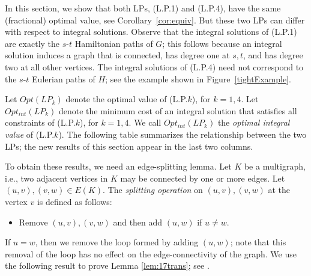 \documentclass[11pt]{article}
\begin{document}
In this section, we show that both LPs, (L.P.1) and (L.P.4), have
the same (fractional) optimal value, see Corollary~\ref{cor:equiv}.
But these two LPs can differ with respect to integral solutions.
Observe that the integral solutions of (L.P.1) are
exactly the $s$-$t$ Hamiltonian paths of $G$;
this follows because an integral solution induces a graph
that is connected, has degree one at $s,t$, and has
degree two at all other vertices.
The integral solutions of (L.P.4) need not correspond to
the $s$-$t$ Eulerian paths of $H$; see the example shown
in Figure~\ref{tightExample}.

Let $Opt(LP_k)$ denote the optimal value  of (L.P.$k$), for $k=1,4$.
Let $Opt_{int}(LP_k)$ denote the minimum cost of
an integral solution that satisfies all constraints of (L.P.$k$),
for $k=1,4$.
We call $Opt_{int}(LP_k)$ the \emph{optimal integral value} of (L.P.$k$).
The following table summarizes the relationship between the two LPs;
the new results of this section appear in the last two columns.


\begin{center}
\setlength{\tabcolsep}{1pt}
\end{center}


To obtain these results, we need an edge-splitting lemma.
Let $K$ be a multigraph, i.e., two adjacent vertices in $K$ may be
connected by one or more edges.
Let $(u, v), (v, w)\in E(K)$. The \emph{splitting operation} on
$(u, v), (v, w)$ at the vertex $v$ is defined as follows:

\begin{itemize}
\item Remove $(u, v), (v, w)$ and then add $(u, w)$ if $u\neq w$.
\end{itemize}

If $u=w$, then we remove the loop formed by adding $(u, w)$; note that
this removal of the loop has no effect on the edge-connectivity of the graph. We use the following
result to prove Lemma \ref{lem:17trans}; see \cite[Theorem $A'$]{Frank92}.
\end{document}
